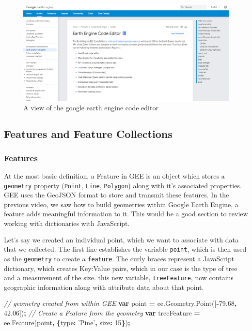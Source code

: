 \documentclass[
]{article}
\newenvironment{Shaded}{\begin{snugshade}}{\end{snugshade}}
\newcommand{\AttributeTok}[1]{\textcolor[rgb]{0.77,0.63,0.00}{#1}}
\newcommand{\CommentTok}[1]{\textcolor[rgb]{0.56,0.35,0.01}{\textit{#1}}}
\newcommand{\DataTypeTok}[1]{\textcolor[rgb]{0.13,0.29,0.53}{#1}}
\newcommand{\DecValTok}[1]{\textcolor[rgb]{0.00,0.00,0.81}{#1}}
\newcommand{\FloatTok}[1]{\textcolor[rgb]{0.00,0.00,0.81}{#1}}
\newcommand{\KeywordTok}[1]{\textcolor[rgb]{0.13,0.29,0.53}{\textbf{#1}}}
\newcommand{\NormalTok}[1]{#1}
\newcommand{\OperatorTok}[1]{\textcolor[rgb]{0.81,0.36,0.00}{\textbf{#1}}}
\newcommand{\StringTok}[1]{\textcolor[rgb]{0.31,0.60,0.02}{#1}}
\newcommand{\VariableTok}[1]{\textcolor[rgb]{0.00,0.00,0.00}{#1}}
\begin{document}
\begin{figure}
\includegraphics[width=0.8\linewidth]{clip_image001} \caption{A view of the google earth engine code editor}\label{fig:code-editor}
\end{figure}

\hypertarget{features-and-feature-collections}{%
\subsection{Features and Feature Collections}\label{features-and-feature-collections}}

\hypertarget{features}{%
\subsubsection{Features}\label{features}}

At the most basic definition, a Feature in GEE is an object which stores a \texttt{geometry} property (\texttt{Point}, \texttt{Line}, \texttt{Polygon}) along with it's associated properties. GEE uses the GeoJSON format to store and transmit these features. In the previous video, we saw how to build geometries within Google Earth Engine, a feature adds meaningful information to it. This would be a good section to review working with dictionaries with JavaScript.

Let's say we created an individual point, which we want to associate with data that we collected. The first line establishes the variable \texttt{point}, which is then used as the \texttt{geometry} to create a \texttt{feature}. The curly braces represent a JavaScript dictionary, which creates Key:Value pairs, which in our case is the type of tree and a measurement of the size. this new variable, \texttt{treeFeature}, now contains geographic information along with attribute data about that point.

\begin{Shaded}
\begin{Highlighting}[]
\CommentTok{// geometry created from within GEE}
\KeywordTok{var}\NormalTok{ point }\OperatorTok{=} \VariableTok{ee}\NormalTok{.}\VariableTok{Geometry}\NormalTok{.}\AttributeTok{Point}\NormalTok{([}\OperatorTok{-}\FloatTok{79.68}\OperatorTok{,} \FloatTok{42.06}\NormalTok{])}\OperatorTok{;}
\CommentTok{// Create a Feature from the geometry}
\KeywordTok{var}\NormalTok{ treeFeature }\OperatorTok{=} \VariableTok{ee}\NormalTok{.}\AttributeTok{Feature}\NormalTok{(point}\OperatorTok{,} \OperatorTok{\{}\DataTypeTok{type}\OperatorTok{:} \StringTok{'Pine'}\OperatorTok{,} \DataTypeTok{size}\OperatorTok{:} \DecValTok{15}\OperatorTok{\}}\NormalTok{)}\OperatorTok{;}
\end{Highlighting}
\end{Shaded}
\end{document}
